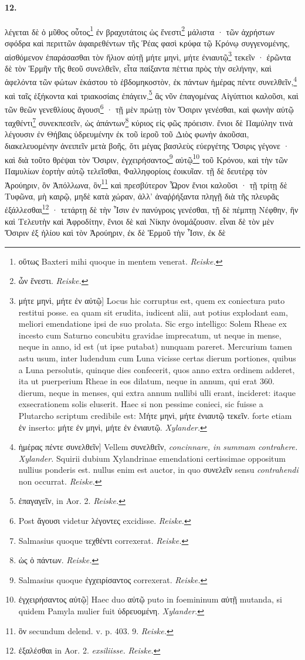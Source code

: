 \documentclass[a4paper, 11pt, oneside, polutonikogreek, german]{article}
\begin{document}
\paragraph{12.}
λέγεται δὲ ὁ μῦθος οὗτος\footnote{οὕτως Baxteri mihi quoque in mentem venerat. \emph{Reiske.}} ἐν βραχυτάτοις ὡς ἔνεστι\footnote{ὧν ἔνεστι. \emph{Reiske.}} μάλιστα · τῶν ἀχρήστων σφόδρα καὶ περιττῶν ἀφαιρεθέντων τῆς Ῥέας φασὶ κρύφα τῷ Κρόνῳ συγγενομένης, αἰσθόμενον ἐπαράσασθαι τὸν ἥλιον αὐτῇ μήτε μηνὶ, μήτε ἐνιαυτῷ\footnote{μήτε μηνὶ, μήτε ἐν αὐτῷ] Locus hic corruptus est, quem ex coniectura puto restitui posse. ea quam sit erudita, iudicent alii, aut potius explodant eam, meliori emendatione ipsi de suo prolata. Sic ergo intelligo: Solem Rheae ex incesto cum Saturno concubitu gravidae imprecatum, ut neque in mense, neque in anno, id est (ut ipse putabat) nunquam pareret. Mercurium tamen astu usum, inter ludendum cum Luna vicisse certas dierum portiones, quibus a Luna persolutis, quinque dies confecerit, quos anno extra ordinem adderet, ita ut puerperium Rheae in eos dilatum, neque in annum, qui erat 360. dierum, neque in menses, qui extra annum nullibi ulli erant, incideret: itaque exsecrationem solis eluserit. Haec si non pessime conieci, sic fuisse a Plutarcho scriptum credibile est: Μήτε μηνὶ, μήτε ἐνιαυτῷ τεκεῖν. forte etiam ἐν inserto: μήτε ἐν μηνὶ, μήτε ἐν ἐνιαυτῷ. \emph{Xylander.}} τεκεῖν · ἐρῶντα δὲ τὸν Ἑρμῆν τῆς θεοῦ συνελθεῖν, εἶτα παίξαντα πέττια πρὸς τὴν σελήνην, καὶ ἀφελόντα τῶν φώτων ἑκάστου τὸ ἑβδομηκοστὸν, ἐκ πάντων ἡμέρας πέντε συνελθεῖν,\footnote{ἡμέρας πέντε συνελθεῖν] Vellem συνελθεῖν, \emph{concinnare, in summam contrahere.} \emph{Xylander.} Squirii dubium Xylandrinae emendationi certissimae oppositum nullius ponderis est. nullus enim est auctor, in quo συνελεῖν sensu \emph{contrahendi} non occurrat. \emph{Reiske.}} καὶ ταῖς ἑξήκοντα καὶ τριακοσίαις ἐπάγειν,\footnote{ἐπαγαγεῖν, in Aor. 2. \emph{Reiske.}} ἃς νῦν ἐπαγομένας Αἰγύπτιοι καλοῦσι, καὶ τῶν θεῶν γενεθλίους ἄγουσι\footnote{Post ἄγουσι videtur λέγοντες excidisse. \emph{Reiske.}} · τῇ μὲν πρώτῃ τὸν Ὄσιριν γενέσθαι, καὶ φωνὴν αὐτῷ ταχθέντι\footnote{Salmasius quoque τεχθέντι correxerat. \emph{Reiske.}} συνεκπεσεῖν, ὡς ἁπάντων\footnote{ὡς ὁ πάντων. \emph{Reiske.}} κύριος εἰς φῶς πρόεισιν. ἔνιοι δὲ Παμύλην τινὰ λέγουσιν ἐν Θήβαις ὑδρευμένην ἐκ τοῦ ἱεροῦ τοῦ Διὸς φωνὴν ἀκοῦσαι, διακελευομένην ἀνειπεῖν μετὰ βοῆς, ὅτι μέγας βασιλεὺς εὐεργέτης Ὄσιρις γέγονε · καὶ διὰ τοῦτο θρέψαι τὸν Ὄσιριν, ἐγχειρήσαντος\footnote{Salmasius quoque ἐγχειρίσαντος correxerat. \emph{Reiske.}} αὐτῷ\footnote{ἐγχειρήσαντος αὐτῷ] Haec duo αὐτῷ puto in foemininum αὐτῇ mutanda, si quidem Pamyla mulier fuit ὑδρευομένη. \emph{Xylander.}} τοῦ Κρόνου, καὶ τὴν τῶν Παμυλίων ἑορτὴν αὐτῷ τελεῖσθαι, Φαλληφορίοις ἐοικυῖαν. τῇ δὲ δευτέρᾳ τὸν Ἀρούηριν, ὃν Ἀπόλλωνα, ὃν\footnote{ὃν secundum delend. v. p. 403. 9. \emph{Reiske.}} καὶ πρεσβύτερον Ὧρον ἔνιοι καλοῦσι · τῇ τρίτῃ δὲ Τυφῶνα, μὴ καιρῷ, μηδὲ κατὰ χώραν, ἀλλ' ἀναῤῥήξαντα πληγῇ διὰ τῆς πλευρᾶς ἐξάλλεσθαι\footnote{ἐξαλέσθαι in Aor. 2. \emph{exsiliisse.} \emph{Reiske.}} · τετάρτῃ δὲ τὴν Ἶσιν ἐν πανύγροις γενέσθαι, τῇ δὲ πέμπτῃ Νέφθην, ἣν καὶ Τελευτὴν καὶ Ἀφροδίτην, ἔνιοι δὲ καὶ Νίκην ὀνομάζουσιν. εἶναι δὲ τὸν μὲν Ὄσιριν ἐξ ἡλίου καὶ τὸν Ἀρούηριν, ἐκ δὲ Ἑρμοῦ τὴν Ἶσιν, ἐκ δὲ 
\end{document}
